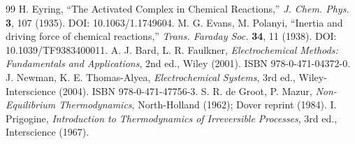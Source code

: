 \documentclass[11pt,a4paper]{article}
\begin{document}
\begin{thebibliography}{99}
 H. Eyring, ``The Activated Complex in Chemical Reactions,'' \emph{J. Chem. Phys.} \textbf{3}, 107 (1935). DOI: 10.1063/1.1749604.
 M. G. Evans, M. Polanyi, ``Inertia and driving force of chemical reactions,'' \emph{Trans. Faraday Soc.} \textbf{34}, 11 (1938). DOI: 10.1039/TF9383400011.
 A. J. Bard, L. R. Faulkner, \emph{Electrochemical Methods: Fundamentals and Applications}, 2nd ed., Wiley (2001). ISBN 978-0-471-04372-0.
 J. Newman, K. E. Thomas-Alyea, \emph{Electrochemical Systems}, 3rd ed., Wiley-Interscience (2004). ISBN 978-0-471-47756-3.
 S. R. de Groot, P. Mazur, \emph{Non-Equilibrium Thermodynamics}, North-Holland (1962); Dover reprint (1984).
 I. Prigogine, \emph{Introduction to Thermodynamics of Irreversible Processes}, 3rd ed., Interscience (1967).
\end{thebibliography}
\end{document}
